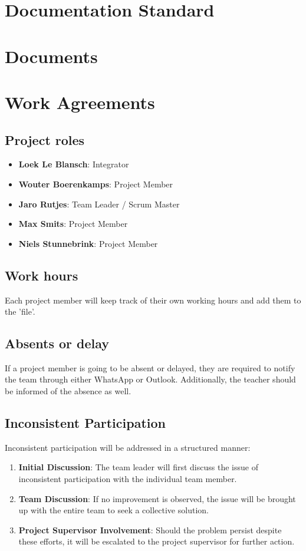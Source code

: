 \documentclass{projdoc}
\begin{document}
\section{Documentation Standard}
\newpage

\section{Documents}
\newpage

\section{Work Agreements}
\subsection{Project roles}

\begin{itemize}
    \item \textbf{Loek Le Blansch}: Integrator
    \item \textbf{Wouter Boerenkamps}: Project Member
    \item \textbf{Jaro Rutjes}: Team Leader / Scrum Master
    \item \textbf{Max Smits}: Project Member
    \item \textbf{Niels Stunnebrink}: Project Member
\end{itemize}


\subsection{Work hours}
Each project member will keep track of their own working hours and 
add them to the 'file'.

\subsection{Absents or delay}
If a project member is going to be absent or delayed, they are required to notify the 
team through either WhatsApp or Outlook. Additionally, the teacher should 
be informed of the absence as well.

\subsection{Inconsistent Participation}
Inconsistent participation will be addressed in a structured manner:

\begin{enumerate}
    \item \textbf{Initial Discussion}: The team leader will first discuss the 
    issue of inconsistent participation with the individual team member.
    \item \textbf{Team Discussion}: If no improvement is observed, the issue 
    will be brought up with the entire team to seek a collective solution.
    \item \textbf{Project Supervisor Involvement}: Should the problem persist 
    despite these efforts, it will be escalated to the project supervisor for 
    further action.
\end{enumerate}
\end{document}
